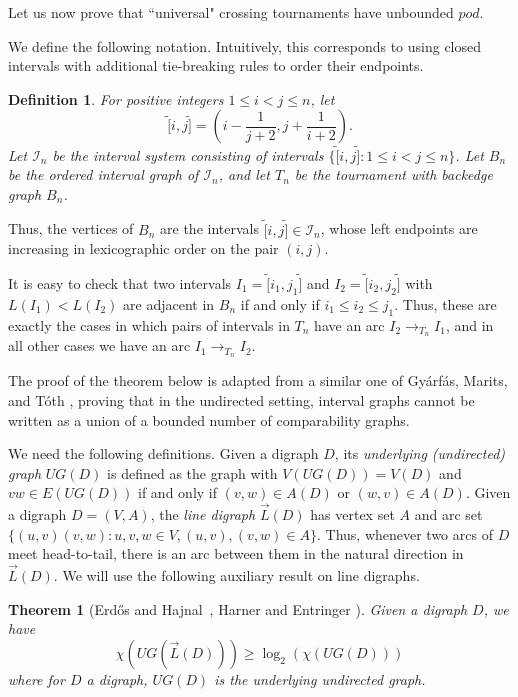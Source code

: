 \documentclass{article}
\newcommand{\itv}[1]{\tilde{[}#1\tilde{]}}
\newcommand{\intI}{\mathcal{I}}
\newcommand{\arrowL}{\overrightarrow{L}}
\newtheorem{theorem}[lemma]{Theorem}
\newtheorem{definition}[lemma]{Definition}
\begin{document}
Let us now prove  that ``universal" crossing tournaments have unbounded $pod$.

We define the following notation.
Intuitively, this corresponds to using closed intervals with additional tie-breaking rules to order their endpoints.
\begin{definition}\label{def:intGeneral}
    For positive integers $1 \leq i < j \leq n$, let \\ $$\itv{i,j} = \left(i-\frac{1}{j+2}, j+\frac{1}{i+2}\right).$$ 
    Let $\intI_n$ be the interval system consisting of intervals $\{\itv{i,j}:1 \leq i < j \leq n\}$. Let $B_n$ be the ordered interval graph of $\intI_n$, and let $T_n$ be the tournament with backedge graph $B_n$.  
\end{definition}



Thus, the vertices of $B_n$ are the intervals $\itv{i,j} \in \intI_n$, whose left endpoints are increasing in lexicographic order on the pair $(i,j)$.



It is easy to check that two intervals $I_1 = \itv{i_1,j_1}$ and $I_2 = \itv{i_2,j_2}$ with $L(I_1) < L(I_2)$ are adjacent in $B_n$ if and only if $i_1 \leq i_2 \leq j_1$. Thus, these are exactly the cases in which pairs of intervals in $T_n$ have an arc $I_2 \rightarrow_{T_n} I_1$, and in all other cases we have an arc $I_1 \rightarrow_{T_n} I_2$.

The proof of the theorem below is adapted from a similar one of Gy{\'a}rf{\'a}s, Marits, and T{\'o}th \cite{perfectIntoComparability}, proving that in the undirected setting, interval graphs cannot be written as a union of a bounded number of comparability graphs. 

We need the following definitions. Given a digraph $D$, its \emph{underlying (undirected) graph} $UG(D)$ is defined as the graph with $V(UG(D)) = V(D)$ and $vw \in E(UG(D))$ if and only if $(v,w) \in A(D)$ or $(w,v) \in A(D)$. Given a digraph $D = (V,A)$, the \emph{line digraph} $\arrowL(D)$ has vertex set $A$ and arc set $\{(u,v)(v,w): u,v,w \in V, (u,v), (v,w) \in A\}$. Thus, whenever two arcs of $D$ meet head-to-tail, there is an arc between them in the natural direction in $\arrowL(D)$. We will use the following auxiliary result on line digraphs.

\begin{theorem}[Erd\H{o}s and Hajnal~\cite{EH66}, Harner and Entringer \cite{loglinedigraph}]\label{thm:logcoloring}
Given a digraph $D$, we have 
$$
\chi(UG(\arrowL(D))) \geq \log_2(\chi(UG(D)))
$$
where for $D$ a digraph, $UG(D)$ is the underlying undirected graph. 
\end{theorem}
\end{document}
